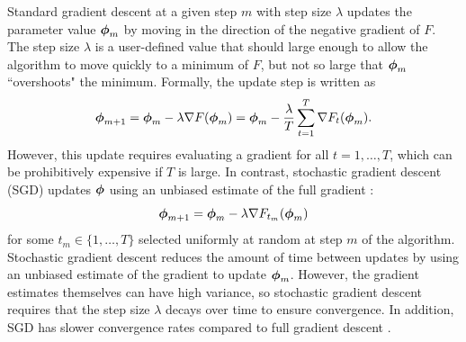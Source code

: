 Standard gradient descent at a given step $m$ with step size $\lambda$ updates the parameter value $\boldsymbol{\phi}_{m}$ by moving in the direction of the negative gradient of $F$. The step size $\lambda$ is a user-defined value that should large enough to allow the algorithm to move quickly to a minimum of $F$, but not so large that $\boldsymbol{\phi}_m$ ``overshoots" the minimum. Formally, the update step is written as
%
\begin{equation}
    \boldsymbol{\phi}_{m+1} = \boldsymbol{\phi}_{m} - \lambda \nabla F(\boldsymbol{\phi}_{m}) =  \boldsymbol{\phi}_{m} - \frac{\lambda}{T} \sum_{t=1}^T \nabla F_t(\boldsymbol{\phi}_{m}).
\end{equation}
%
However, this update requires evaluating a gradient for all $t = 1,\ldots,T$, which can be prohibitively expensive if $T$ is large. In contrast, stochastic gradient descent (SGD) updates $\boldsymbol{\phi}$ using an unbiased estimate of the full gradient \citep{Robbins:1951}:
%
\begin{equation}
    \boldsymbol{\phi}_{m+1} = \boldsymbol{\phi}_{m} - \lambda \nabla F_{t_{m}}(\boldsymbol{\phi}_{m})
\end{equation}
%
for some $t_{m} \in \{1,\ldots,T\}$ selected uniformly at random at step $m$ of the algorithm. Stochastic gradient descent reduces the amount of time between updates by using an unbiased estimate of the gradient to update $\boldsymbol{\phi}_{m}$. However, the gradient estimates themselves can have high variance, so stochastic gradient descent requires that the step size $\lambda$ decays over time to ensure convergence. In addition, SGD has slower convergence rates compared to full gradient descent \citep{Schmidt:2017}.

